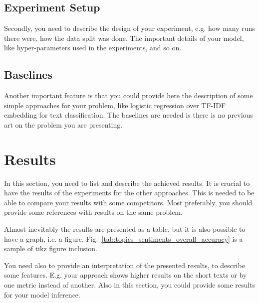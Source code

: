 \documentclass{zapiski}
\begin{document}
\subsection{Experiment Setup}
Secondly, you need to describe the design of your experiment, e.g. how many runs there were, how the data split was done. The important details of your model, like hyper-parameters used in the experiments, and so on.

\subsection{Baselines}
Another important feature is that you could provide here the description of some simple approaches for your problem, like logistic regression over TF-IDF embedding for text classification. The baselines are needed is there is no previous art on the problem you are presenting.

\section{Results}
In this section, you need to list and describe the achieved results. It is crucial to have the results of the experiments for the other approaches. This is needed to be able to compare your results with some competitors. Most preferably, you should provide some references with results on the same problem.

Almost inevitably the results are presented as a table, but it is also possible to have a graph, i.e. a figure. Fig.~\ref{tab:topics_sentiments_overall_accuracy} is a sample of tikz figure inclusion.

You need also to provide an interpretation of the presented results, to describe some features. E.g. your approach shows higher results on the short texts or by one metric instead of another. Also in this section, you could provide some results for your model inference.
\end{document}
